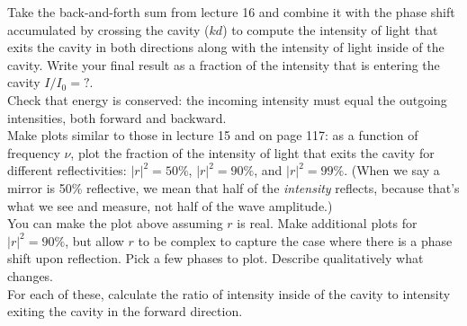 \documentclass[11pt]{hmcpset}
\begin{document}
\problemlist{}





\begin{problem}
	Take the back-and-forth sum from lecture 16 and combine it with the phase shift accumulated by crossing the cavity ($kd$) to compute the intensity of light that exits the cavity in both directions along with the intensity of light inside of the cavity. Write your final result as a fraction of the intensity that is entering the cavity $I/I_0=?$. \\
	
	Check that energy is conserved: the incoming intensity must equal the outgoing intensities, both forward and backward. \\
	
	Make plots similar to those in lecture 15 and on page 117: as a function of frequency $\nu$, plot the fraction of the intensity of light that exits the cavity for different reflectivities: $|r|^2=50\%$, $|r|^2=90\%$, and $|r|^2=99\%$. (When we say a mirror is 50\% reflective, we mean that half of the \textit{intensity} reflects, because that's what we see and measure, not half of the wave amplitude.)	\\
	
	You can make the plot above assuming $r$ is real. Make additional plots for $|r|^2=90\%$, but allow $r$ to be complex to capture the case where there is a phase shift upon reflection. Pick a few phases to plot. Describe qualitatively what changes.	\\
	
	For each of these, calculate the ratio of intensity inside of the cavity to intensity exiting the cavity in the forward direction.
\end{problem}

\begin{solution}
	\vfill
\end{solution}
\pagebreak
\end{document}
